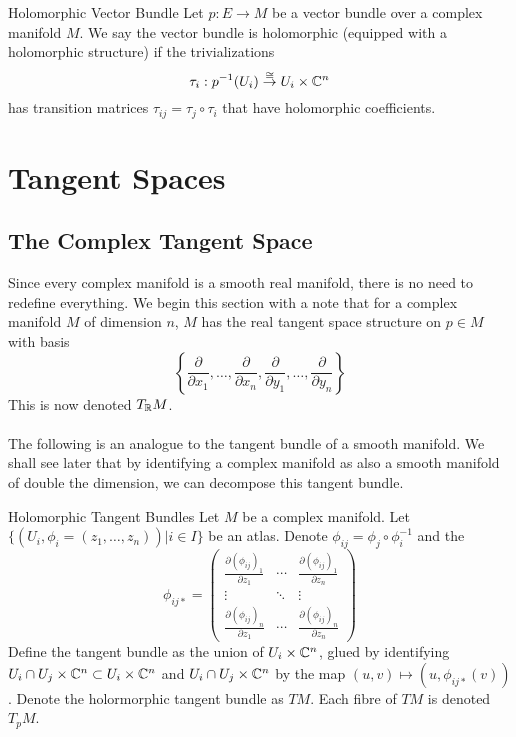 \documentclass[a4paper]{article}
\begin{document}
\begin{defn}{Holomorphic Vector Bundle}{} Let $p:E\to M$ be a vector bundle over a complex manifold $M$. We say the vector bundle is holomorphic (equipped with a holomorphic structure) if the trivializations $$\tau_i:p^{-1}(U_i)\overset{\cong}{\to}U_i\times\mathbb{C}^n$$ has transition matrices $\tau_{ij}=\tau_j\circ\tau_i$ that have holomorphic coefficients. 
\end{defn}

\pagebreak
\section{Tangent Spaces}
\subsection{The Complex Tangent Space}
Since every complex manifold is a smooth real manifold, there is no need to redefine everything. We begin this section with a note that for a complex manifold $M$ of dimension $n$, $M$ has the real tangent space structure on $p\in M$ with basis $$\left\{\frac{\partial}{\partial x_1},\dots,\frac{\partial}{\partial x_n},\frac{\partial}{\partial y_1},\dots,\frac{\partial}{\partial y_n}\right\}$$ This is now denoted $T_{\mathbb{R}}M$. \\~\\

The following is an analogue to the tangent bundle of a smooth manifold. We shall see later that by identifying a complex manifold as also a smooth manifold of double the dimension, we can decompose this tangent bundle. 

\begin{defn}{Holomorphic Tangent Bundles}{} Let $M$ be a complex manifold. Let $\{(U_i,\phi_i=(z_1,\dots,z_n))|i\in I\}$ be an atlas. Denote $\phi_{ij}=\phi_j\circ\phi_i^{-1}$ and the $$\phi_{ij\ast}=\begin{pmatrix}
\frac{\partial (\phi_{ij})_1}{\partial z_1} & \cdots & \frac{\partial (\phi_{ij})_1}{\partial z_n}\\
\vdots & \ddots & \vdots\\
\frac{\partial (\phi_{ij})_n}{\partial z_1} & \cdots & \frac{\partial (\phi_{ij})_n}{\partial z_n}
\end{pmatrix}$$ Define the tangent bundle as the union of $U_i\times\mathbb{C}^n$, glued by identifying $U_i\cap U_j\times\mathbb{C}^n\subset U_i\times\mathbb{C}^n$ and $U_i\cap U_j\times\mathbb{C}^n$ by the map $(u,v)\mapsto(u,\phi_{ij\ast}(v))$. Denote the holormorphic tangent bundle as $TM$. Each fibre of $TM$ is denoted $T_pM$. 
\end{defn}
\end{document}
